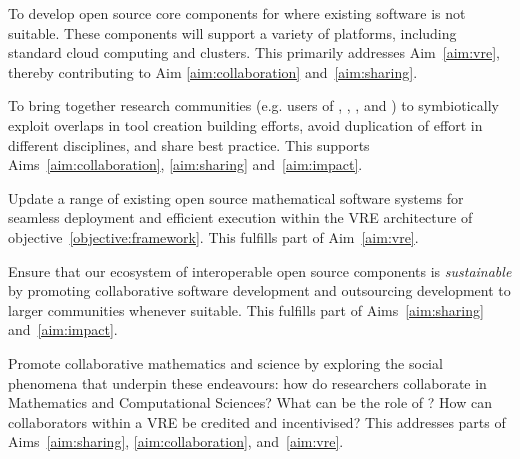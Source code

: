 \documentclass[noworkareas,deliverables,\classoptions]{euproposal}       %
\begin{document}
\begin{proposal}
\begin{compactenum}
\item\label{objectives:core} To develop open source core components
  for \VREs where existing software is not suitable. These components
  will support a variety of platforms, including standard cloud
  computing and clusters. This primarily addresses Aim~\ref{aim:vre},
  thereby contributing to Aim \ref{aim:collaboration}
  and~\ref{aim:sharing}.

\item \label{objective:community} To bring together research
  communities (e.g. users of \Jupyter, \Sage, \Singular, and \GAP) to
  symbiotically exploit overlaps in tool creation building efforts,
  avoid duplication of effort in different disciplines, and share best
  practice. This supports Aims~\ref{aim:collaboration},
  \ref{aim:sharing} and~\ref{aim:impact}.

\item \label{objective:updates} Update a range of existing open source
  mathematical software systems for seamless deployment and efficient
  execution within the VRE architecture of objective~\ref{objective:framework}.
  This fulfills part of Aim~\ref{aim:vre}.



\item \label{objective:sustainable} Ensure that our ecosystem of
  interoperable open source components is \emph{sustainable} by
  promoting collaborative software development and outsourcing
  development to larger communities whenever suitable. This fulfills
  part of Aims~\ref{aim:sharing} and~\ref{aim:impact}.

\item \label{objective:social} Promote collaborative mathematics and
  science by exploring the social phenomena that underpin these
  endeavours: how do researchers collaborate in Mathematics and
  Computational Sciences?  What can be the role of \VREs?  How can
  collaborators within a VRE be credited and incentivised? This
  addresses parts of Aims~\ref{aim:sharing}, \ref{aim:collaboration},
  and~\ref{aim:vre}.


\end{compactenum}
\end{proposal}
\end{document}
